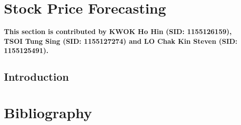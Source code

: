 \documentclass[11pt,a4paper]{article}
\begin{document}
    \newpage
    \section{Stock Price Forecasting}
    \textbf{This section is contributed by KWOK Ho Hin (SID: 1155126159), TSOI Tung Sing (SID: 1155127274) and LO Chak Kin Steven (SID: 1155125491).}
    
    \subsection{Introduction}
    
    
    \newpage
    \section{Bibliography}
    
    
\end{document}
